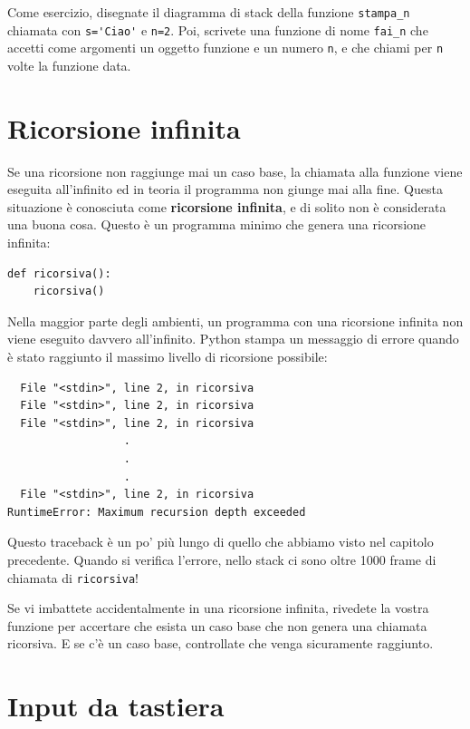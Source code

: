 \documentclass[10pt]{book}
\begin{document}
Come esercizio, disegnate il diagramma di stack della funzione \verb"stampa_n" chiamata con \verb"s='Ciao'" e {\tt n=2}. Poi, scrivete una funzione di nome \verb"fai_n" che accetti come argomenti un oggetto funzione e un numero {\tt n}, e che chiami per {\tt n} volte la funzione data.


\section{Ricorsione infinita}


Se una ricorsione non raggiunge mai un caso base, la chiamata alla funzione viene eseguita all'infinito ed in teoria il programma non giunge mai alla fine. Questa situazione è conosciuta come {\bf ricorsione infinita}, e di solito non è considerata una buona cosa.
Questo è un programma minimo che genera una ricorsione infinita:

\begin{verbatim}
def ricorsiva():
    ricorsiva()
\end{verbatim}
%
Nella maggior parte degli ambienti, un programma con una ricorsione infinita non viene eseguito davvero all'infinito. Python stampa un messaggio di errore quando è stato raggiunto il massimo livello di ricorsione possibile:

\begin{verbatim}
  File "<stdin>", line 2, in ricorsiva
  File "<stdin>", line 2, in ricorsiva
  File "<stdin>", line 2, in ricorsiva
                  .   
                  .
                  .
  File "<stdin>", line 2, in ricorsiva
RuntimeError: Maximum recursion depth exceeded
\end{verbatim}
%
Questo traceback è un po' più lungo di quello che abbiamo visto nel capitolo precedente. Quando si verifica l'errore, nello stack ci sono oltre 1000 frame di chiamata di {\tt ricorsiva}!

Se vi imbattete accidentalmente in una ricorsione infinita, rivedete la vostra funzione per accertare che esista un caso base che non genera una chiamata ricorsiva. E se c'è un caso base, controllate che venga sicuramente raggiunto.

\section{Input da tastiera}
\end{document}
